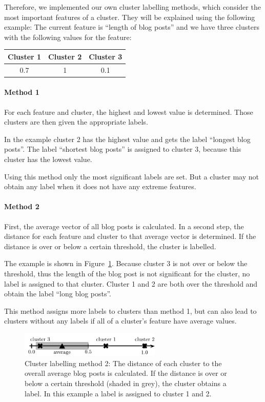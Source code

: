 Therefore, we implemented our own cluster labelling methods, which consider the most important features of a cluster.
They will be explained using the following example:
The current feature is ``length of blog posts'' and we have three clusters with the following values for the feature:
\begin{center}
\begin{tabular}{c|c|c}
  Cluster 1 & Cluster 2 & Cluster 3 \\ \hline
  0.7 & 1 & 0.1 \\
 \end{tabular}
\end{center}


\paragraph{Method 1}
For each feature and cluster, the highest and lowest value is determined.
Those clusters are then given the appropriate labels.

In the example cluster 2 has the highest value and gets the label ``longest blog posts''.
The label ``shortest blog posts'' is assigned to cluster 3, because this cluster has the lowest value.

Using this method only the most significant labels are set.
But a cluster may not obtain any label when it does not have any extreme features.


\paragraph{Method 2}
First, the average vector of all blog posts is calculated.
In a second step, the distance for each feature and cluster to that average vector is determined.
If the distance is over or below a certain threshold, the cluster is labelled.

The example is shown in Figure~\ref{fig:cluster_labeling_2}.
Because cluster 3 is not over or below the threshold, thus the length of the blog post is not significant for the cluster, no label is assigned to that cluster.
Cluster 1 and 2 are both over the threshold and obtain the label ``long blog posts''.

This method assigns more labels to clusters than method 1, but can also lead to clusters without any labels if all of a cluster's feature have average values.

\begin{figure}[ht!]
	\centering
	\includegraphics[width=0.6\textwidth]{images/cluster_labeling_2.pdf}
	\caption{Cluster labelling method 2: The distance of each cluster to the overall average blog posts is calculated. If the distance is over or below a certain threshold (shaded in grey), the cluster obtains a label. In this example a label is assigned to cluster 1 and 2.}
	\label{fig:cluster_labeling_2}
\end{figure}


